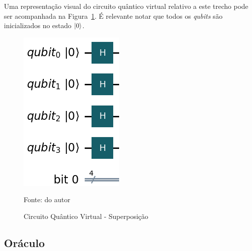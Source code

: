 Uma representação visual do circuito quântico virtual relativo a este trecho pode ser acompanhada na Figura~\ref{fig: preparacaoInicial}. É relevante notar que todos os \textit{qubits} são inicializados no estado $\ket{0}$.
%
\begin{figure}[!htb]
    \centering
    \caption{Circuito Quântico Virtual - Superposição}
    \label{fig: preparacaoInicial} 
    
    \includegraphics[scale=0.5]{Imagens/preparacaoInicial.png}

    \vspace{0.3em}
    {\small Fonte: do autor} %
\end{figure}
%
\subsection{Or\'{a}culo}
\label{subSec: oraculoTeo}

